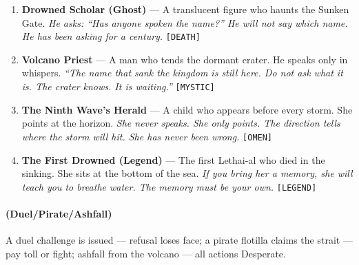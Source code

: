 \begin{enumerate}
  \hfill \textit{It demands a name. It offers power. It takes memory.} \texttt{[THREAT]}
\item {} \textbf{Drowned Scholar (Ghost)} --- A translucent figure who haunts the Sunken Gate.
  \hfill \textit{He asks: ``Has anyone spoken the name?'' He will not say which name. He has been asking for a century.} \texttt{[DEATH]}
\item {} \textbf{Volcano Priest} --- A man who tends the dormant crater. He speaks only in whispers.
  \hfill \textit{``The name that sank the kingdom is still here. Do not ask what it is. The crater knows. It is waiting.''} \texttt{[MYSTIC]}
\item {} \textbf{The Ninth Wave's Herald} --- A child who appears before every storm. She points at the horizon.
  \hfill \textit{She never speaks. She only points. The direction tells where the storm will hit. She has never been wrong.} \texttt{[OMEN]}
\item {} \textbf{The First Drowned (Legend)} --- The first Lethai-al who died in the sinking. She sits at the bottom of the sea.
  \hfill \textit{If you bring her a memory, she will teach you to breathe water. The memory must be your own.} \texttt{[LEGEND]}
\end{enumerate}

\paragraph*{(Duel/Pirate/Ashfall)} A duel challenge is issued --- refusal loses face; a pirate flotilla claims the strait --- pay toll or fight; ashfall from the volcano --- all actions Desperate.

